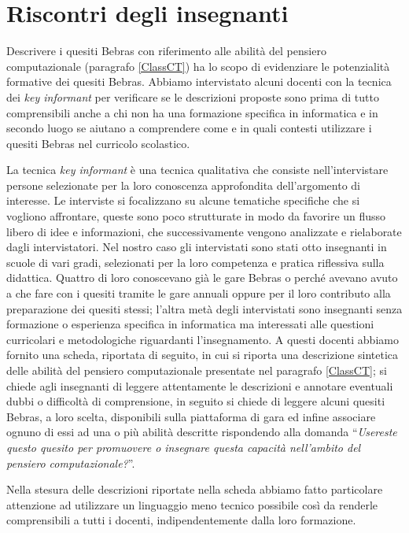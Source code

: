 \documentclass[12pt]{report}
\begin{document}
\begin{itemize}
\end{itemize}

\section{Riscontri degli insegnanti} \label{interviste}
Descrivere i quesiti Bebras con riferimento alle abilità del pensiero computazionale (paragrafo \ref{ClassCT}) ha lo scopo di evidenziare le potenzialità formative dei quesiti Bebras.
Abbiamo intervistato alcuni docenti con la tecnica dei \textit{key informant} per verificare se le descrizioni proposte sono prima di tutto comprensibili anche a chi non ha una formazione specifica in informatica e in secondo luogo se aiutano a comprendere come e in quali contesti utilizzare i quesiti Bebras nel curricolo scolastico.


La tecnica \textit{key informant} è una tecnica qualitativa che consiste nell'intervistare persone selezionate per la loro conoscenza approfondita dell'argomento di interesse. Le interviste si focalizzano su alcune tematiche specifiche che si vogliono affrontare, queste sono poco strutturate in modo da favorire un flusso libero di idee e informazioni, che successivamente vengono analizzate e rielaborate dagli intervistatori.
Nel nostro caso gli intervistati sono stati otto insegnanti in scuole di vari gradi, selezionati per la loro competenza e pratica riflessiva sulla didattica. Quattro di loro conoscevano già le gare Bebras o perché avevano avuto a che fare con i quesiti tramite le gare annuali oppure per il loro contributo alla preparazione dei quesiti stessi; l'altra metà degli intervistati sono insegnanti senza formazione o esperienza specifica in informatica ma interessati alle questioni curricolari e metodologiche riguardanti l'insegnamento.
A questi docenti abbiamo fornito una scheda, riportata di seguito, in cui si riporta una descrizione sintetica delle abilità del pensiero computazionale presentate nel paragrafo \ref{ClassCT}; si chiede agli insegnanti di leggere attentamente le descrizioni e annotare eventuali dubbi o difficoltà di comprensione, in seguito si chiede di leggere alcuni quesiti Bebras, a loro scelta, disponibili sulla piattaforma di gara ed infine associare ognuno di essi ad una o più abilità descritte rispondendo alla domanda ``\textit{Usereste questo quesito per promuovere o insegnare questa capacità nell'ambito del pensiero computazionale?}''.


Nella stesura delle descrizioni riportate nella scheda abbiamo fatto particolare attenzione ad utilizzare un linguaggio meno tecnico possibile così da renderle comprensibili a tutti i docenti, indipendentemente dalla loro formazione.
\end{document}
